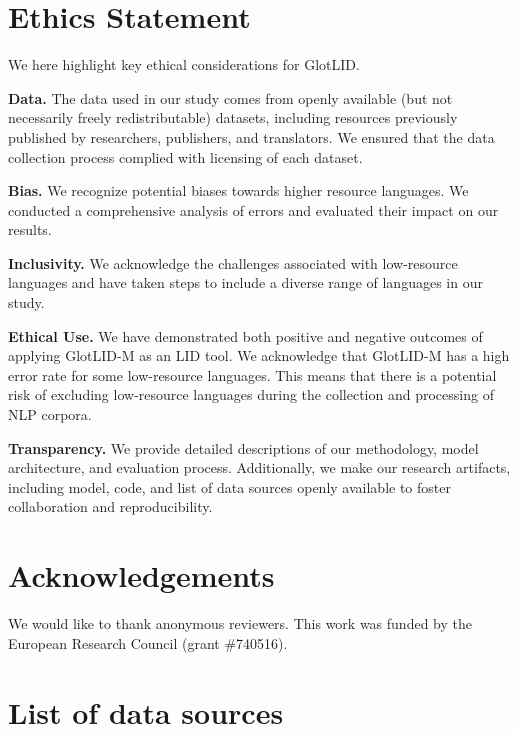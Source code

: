 \documentclass[11pt]{article}
\def\modelname{\mbox{GlotLID-M}\xspace}
\def\genericname{\mbox{GlotLID}\xspace}
\def\seclabel#1{\label{sec:#1}\label{p:#1}}
\begin{document}
\section*{Ethics Statement}
We here highlight key ethical considerations for
\genericname.

\textbf{Data.}
The data used in our study comes from openly available
(but not necessarily freely redistributable)
datasets, including resources previously published by
researchers, publishers, and translators. We ensured that
the data collection process complied with licensing of each
dataset.

\textbf{Bias.} 
We recognize potential biases towards higher resource languages. We conducted a comprehensive analysis of errors and evaluated their impact on our results.

\textbf{Inclusivity.}
We acknowledge the challenges associated with low-resource languages and have taken steps to include a diverse range of languages in our study. 


\textbf{Ethical Use.}
We have demonstrated both positive and negative outcomes of
applying \modelname as an LID tool. We acknowledge
that \modelname
has a high error rate for some low-resource languages.
This means that there is a  potential risk of
excluding low-resource languages during the collection and
processing of NLP corpora.



\textbf{Transparency.}
We provide detailed descriptions of our methodology, model
architecture, and evaluation process. Additionally, we  make
our research artifacts, including model, code, and list of data sources openly available
to foster collaboration and reproducibility.


\section{Acknowledgements}

We would like to thank anonymous reviewers.
This work was funded by the European Research
Council (grant \#740516).

\newpage




\clearpage
\appendix

\section{List of data sources}\seclabel{datasources}
\end{document}
